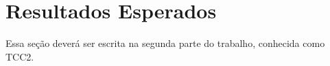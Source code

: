 \documentclass[12pt]{article}
\begin{document}
\section{Resultados Esperados}
Essa seção deverá ser escrita na segunda parte do trabalho, conhecida como TCC2.


\printbibliography  %
\end{document}
